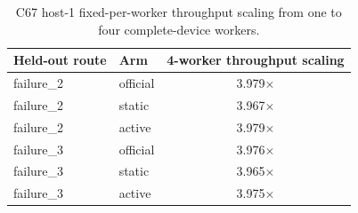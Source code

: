 \begin{table}[t]
\centering
\caption{C67 host-1 fixed-per-worker throughput scaling from one to four complete-device workers.}
\label{tab:c67-scaling}
\scriptsize
\begin{tabular}{@{}llc@{}}
\toprule
Held-out route & Arm & 4-worker throughput scaling \\
\midrule
failure\_2 & official & 3.979$\times$ \\
failure\_2 & static & 3.967$\times$ \\
failure\_2 & active & 3.979$\times$ \\
failure\_3 & official & 3.976$\times$ \\
failure\_3 & static & 3.965$\times$ \\
failure\_3 & active & 3.975$\times$ \\
\bottomrule
\end{tabular}
\end{table}
